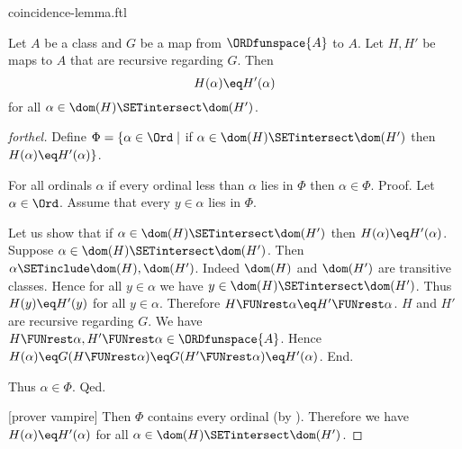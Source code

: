 \documentclass{naproche-library}
\begin{document}
\begin{smodule}[title=The Coincidence Lemma]{coincidence-lemma.ftl}
  
\begin{lemma}[forthel,title=Coincidence Lemma,id=transfinite-recursion_coincidence]
  Let $A$ be a class and $G$ be a map from $\ORDfunspace{A}$ to $A$.
  Let $H, H'$ be maps to $A$ that are recursive regarding $G$.
  Then \[ H(\alpha) \eq H'(\alpha) \] for all $\alpha \in \dom(H) \SETintersect \dom(H')$.
\end{lemma}
\begin{proof}[forthel]
  Define $\Phi = \{ \alpha \in \Ord \mid$ if
  $\alpha \in \dom(H) \SETintersect \dom(H')$ then $H(\alpha) \eq H'(\alpha) \}$.

  For all ordinals $\alpha$ if every ordinal less than $\alpha$ lies in $\Phi$ then $\alpha \in \Phi$. \newline
  Proof.
    Let $\alpha \in \Ord$.
    Assume that every $y \in \alpha$ lies in $\Phi$.

    Let us show that if $\alpha \in \dom(H) \SETintersect \dom(H')$ then
    $H(\alpha) \eq H'(\alpha)$.
      Suppose $\alpha \in \dom(H) \SETintersect \dom(H')$.
      Then $\alpha \SETinclude \dom(H), \dom(H')$.
      Indeed $\dom(H)$ and $\dom(H')$ are transitive classes.
      Hence for all $y \in \alpha$ we have $y \in \dom(H) \SETintersect \dom(H')$.
      Thus $H(y) \eq H'(y)$ for all $y \in \alpha$.
      Therefore $H \FUNrest \alpha \eq H' \FUNrest \alpha$.
      $H$ and $H'$ are recursive regarding $G$.
      We have $H \FUNrest \alpha, H' \FUNrest \alpha \in \ORDfunspace{A}$.
      Hence $H(\alpha)
        \eq G(H \FUNrest \alpha)
        \eq G(H' \FUNrest \alpha)
        \eq H'(\alpha)$.
    End.

    Thus $\alpha \in \Phi$.
  Qed.

  [prover vampire]
  Then $\Phi$ contains every ordinal (by ).
  Therefore we have $H(\alpha) \eq H'(\alpha)$ for all $\alpha \in \dom(H) \SETintersect \dom(H')$.
\end{proof}
\end{smodule}
\end{document}
